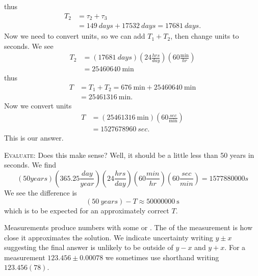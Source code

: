 thus
\begin{equation}
\begin{split}
T_{2} &= \tau_2+\tau_3\\
&=\SI{149}{days}+\SI{17532}{days}=\SI{17681}{days}.
\end{split}
\end{equation}
Now we need to convert units, so we can add $T_1+T_2$, then
change units to seconds. We see
\begin{equation}
\begin{split}
T_{2} &= 
(\SI{17681}{days})\left(24\frac{\si{hrs}}{\si{day}}\right)
\left(60\frac{\si{\minute}}{\si{hr}}\right)\\
&= \SI{25460640}{\minute}
\end{split}
\end{equation}
thus
\begin{equation}
\begin{split}
T &= T_1+T_2 = \SI{676}{\minute} + \SI{25460640}{\minute}\\
&=\SI{25461316}{\minute}.
\end{split}
\end{equation}
Now we convert units
\begin{equation}
\begin{split}
T &= (\SI{25461316}{\minute})\left(60\frac{\si{sec}}{\si{\minute}}\right)\\
&=\SI{1527678960}{sec}.
\end{split}
\end{equation}
This is our answer.

\textsc{Evaluate:}
Does this make sense? Well, it should be a little less than 50
years in seconds. We find
\begin{equation}
\!(50\si{years})
\!\!\left(365.25\frac{\si{day}}{\si{year}}\right) 
\!\!\left(24\frac{\si{hrs}}{\si{day}}\right)
\!\!\left(60\frac{\si{min}}{\si{hr}}\right)
\!\!\left(60\frac{\si{sec}}{\si{min}}\right)
=1577880000\si{s}
\end{equation}
We see the difference is
\begin{equation}
(\SI{50}{years})-T\approx \SI{50000000}{\second}
\end{equation}
which is to be expected for an approximately correct $T$.

Measurements produce numbers with some 
or . The  of the measurement is
how close it approximates the solution. We indicate uncertainty
writing $y\pm x$ suggesting the final answer is unlikely to be
outside of $y-x$ and $y+x$. For a measurement $123.456\pm0.00078$
we sometimes use shorthand writing $123.456(78)$. 

